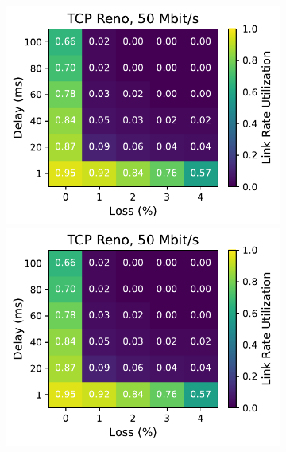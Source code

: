 \begin{figure}[ht]
\begin{subfigure}[b]{0.89cm}
        \includegraphics[width=\linewidth,trim={8cm 0 0 0},clip]{splitting-paper/figures/heatmaps/heatmap_tcp_reno_50mbps.pdf}
        \includegraphics[width=\linewidth,trim={8cm 0 0 0},clip]{splitting-paper/figures/heatmaps/heatmap_tcp_reno_50mbps.pdf}

\end{subfigure}
\end{figure}
